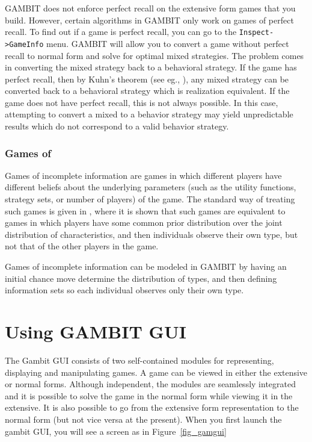 GAMBIT does not enforce perfect recall on the extensive form games that
you build.  However, certain algorithms in GAMBIT only work on games of 
perfect recall.  
To find out if a game is perfect recall, you can go to the {\tt Inspect->GameInfo} 
menu.  GAMBIT will allow you to convert a game without perfect recall 
to normal form and solve for optimal 
mixed strategies.  The problem comes in converting the mixed strategy back
to a behavioral strategy.  If the game has perfect recall, then by Kuhn's 
theorem (see eg., \cite{vanDamme:1983}), any mixed strategy can be 
converted back to a behavioral strategy which is realization equivalent.   
If the game does not have perfect recall, this is not always possible.  
In this case, attempting to convert a mixed to a behavior strategy 
may yield unpredictable results which do not correspond to a valid 
behavior strategy.   

\subsection{Games of }\label{incinfsec}
Games of incomplete information are games in which different players have 
different beliefs about the underlying parameters (such as the utility 
functions, strategy sets, or number of players) of the game.  The standard 
way of treating such games is given in \cite{Harsanyi:1967}, where it
is shown that 
 such games are equivalent to games in which players have some common
prior distribution over the joint distribution of characteristics, and
 then individuals observe their own type, but not that of the other players 
in the game.  

Games of incomplete information can be modeled in GAMBIT by having an
initial chance move determine the distribution of types, and then
defining information sets so each individual observes only their own
type.

\chapter{Using GAMBIT GUI}

The Gambit GUI consists of two self-contained modules for representing,
displaying and manipulating games.  A game can be viewed in either the
extensive or normal forms.  Although independent, the modules are
seamlessly integrated and it is possible to solve the game in the normal
form while viewing it in the extensive.  It is also possible to go from
the extensive form representation to the normal form (but not vice versa
at the present).  When you first launch the gambit GUI, you will see a screen 
as in Figure~\ref{fig_gamgui} 

